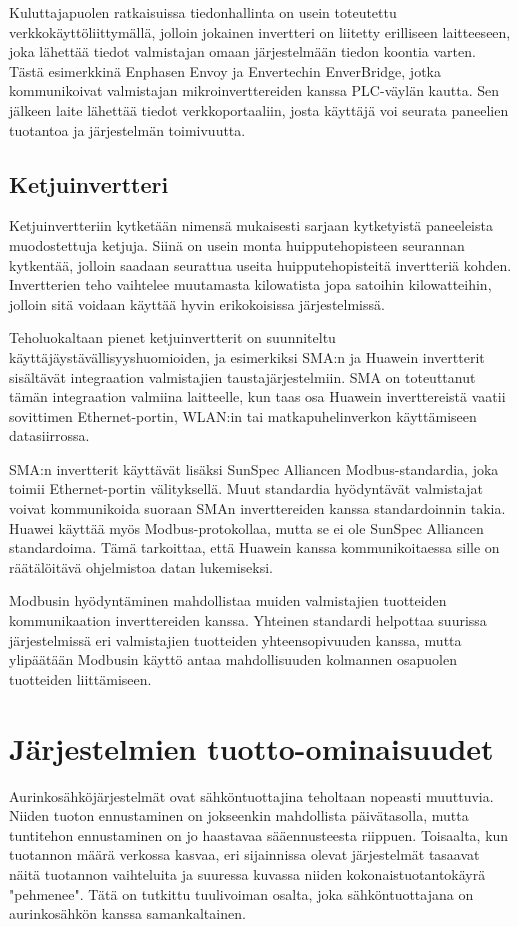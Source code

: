   Kuluttajapuolen ratkaisuissa tiedonhallinta on usein toteutettu verkkokäyttöliittymällä, jolloin jokainen invertteri on liitetty erilliseen laitteeseen, joka lähettää tiedot valmistajan omaan järjestelmään tiedon koontia varten. Tästä esimerkkinä Enphasen Envoy ja Envertechin EnverBridge, jotka kommunikoivat valmistajan mikroinverttereiden kanssa PLC-väylän kautta. Sen jälkeen laite lähettää tiedot verkkoportaaliin, josta käyttäjä voi seurata paneelien tuotantoa ja järjestelmän toimivuutta. \parencite{Enphase, Envertech}

\subsection{Ketjuinvertteri}
  Ketjuinvertteriin kytketään nimensä mukaisesti sarjaan kytketyistä paneeleista muodostettuja ketjuja. Siinä on usein monta huipputehopisteen seurannan kytkentää, jolloin saadaan seurattua useita huipputehopisteitä invertteriä kohden. Invertterien teho vaihtelee muutamasta kilowatista jopa satoihin kilowatteihin, jolloin sitä voidaan käyttää hyvin erikokoisissa järjestelmissä.

  Teholuokaltaan pienet ketjuinvertterit on suunniteltu käyttäjäystävällisyyshuomioiden, ja esimerkiksi SMA:n ja Huawein invertterit sisältävät integraation valmistajien taustajärjestelmiin. SMA on toteuttanut tämän integraation valmiina laitteelle, kun taas osa Huawein inverttereistä vaatii sovittimen Ethernet-portin, WLAN:in tai matkapuhelinverkon käyttämiseen datasiirrossa.

  SMA:n invertterit käyttävät lisäksi SunSpec Alliancen Modbus-standardia, joka toimii Ethernet-portin välityksellä. Muut standardia hyödyntävät valmistajat voivat kommunikoida suoraan SMAn inverttereiden kanssa standardoinnin takia. Huawei käyttää myös Modbus-protokollaa, mutta se ei ole SunSpec Alliancen standardoima. Tämä tarkoittaa, että Huawein kanssa kommunikoitaessa sille on räätälöitävä ohjelmistoa datan lukemiseksi. \parencite{SMAManual, Huawei}

  Modbusin hyödyntäminen mahdollistaa muiden valmistajien tuotteiden kommunikaation inverttereiden kanssa. Yhteinen standardi helpottaa suurissa järjestelmissä eri valmistajien tuotteiden yhteensopivuuden kanssa, mutta ylipäätään Modbusin käyttö antaa mahdollisuuden kolmannen osapuolen tuotteiden liittämiseen.

\section{Järjestelmien tuotto-ominaisuudet}
  Aurinkosähköjärjestelmät ovat sähköntuottajina teholtaan nopeasti muuttuvia. Niiden tuoton ennustaminen on jokseenkin mahdollista päivätasolla, mutta tuntitehon ennustaminen on jo haastavaa sääennusteesta riippuen. Toisaalta, kun tuotannon määrä verkossa kasvaa, eri sijainnissa olevat järjestelmät tasaavat näitä tuotannon vaihteluita ja suuressa kuvassa niiden kokonaistuotantokäyrä "pehmenee". Tätä on tutkittu tuulivoiman osalta, joka sähköntuottajana on aurinkosähkön kanssa samankaltainen. \parencite{FluctuationIssues}
  
